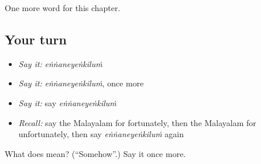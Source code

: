 \begin{grammarlens}[title={What you've built}]
One more word for this chapter.
\end{grammarlens}

\subsection*{Your turn}
\begin{itemize}
\raggedright
  \item \emph{Say it:} \emph{eṅṅaneyeṅkiluṁ}
  \item \emph{Say it:} \emph{eṅṅaneyeṅkiluṁ}, once more
  \item \emph{Say it:} say \emph{eṅṅaneyeṅkiluṁ}
  \item \emph{Recall:} say the Malayalam for fortunately, then the Malayalam for unfortunately, then say \emph{eṅṅaneyeṅkiluṁ} again
\end{itemize}

\begin{tcolorbox}[breakable,colback=teal!4,colframe=teal!35!black,title={Before you move on}]
What does  mean? (\textquotedblleft{}Somehow\textquotedblright{}.) Say it once more.
\end{tcolorbox}
